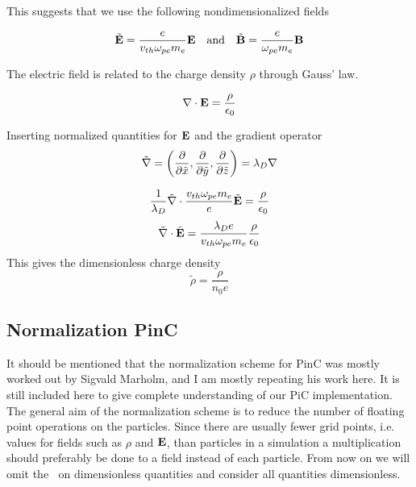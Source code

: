         This suggests that we use the following nondimensionalized fields

        \begin{equation}
            \tilde{\vb{E}} = \frac{e}{v_{th}\omega_{pe}m_e}\vb{E} \quad{\text{and}} \quad \tilde{\vb{B}} = \frac{e}{\omega_{pe}m_e}\vb{B}
        \end{equation}

        The electric field is related to the charge density \(\rho\) through Gauss'
        law.

        \begin{equation}
            \nabla \cdot \vb{E} = \frac{\rho}{\epsilon_0}
        \end{equation}

        Inserting normalized quantities for \(\vb{E}\) and the gradient operator
        \[\tilde{\nabla}=\left(\pdv{\tilde x}, \pdv{\tilde y} , \pdv{\tilde z}\right) = \lambda_D \nabla\]

        \begin{equation}
            \frac{1}{\lambda_D}\tilde\nabla \cdot \frac{v_{th}\omega_{pe}m_e}{e}\tilde{\vb{E}} = \frac{\rho}{\epsilon_0}
        \end{equation}
        \begin{equation}
            \tilde\nabla \cdot\tilde{\vb{E}} = \frac{\lambda_De}{v_{th}\omega_{pe}m_e}\frac{\rho}{\epsilon_0}
        \end{equation}
        This gives the dimensionless charge density
        \begin{equation}
            \tilde \rho = \frac{\rho}{n_0e}
        \end{equation}

    \subsection{Normalization PinC}
        It should be mentioned that the normalization scheme for PinC was mostly worked
        out by Sigvald Marholm, and I am mostly repeating his work here. It is still
        included here to give complete understanding of our PiC implementation.
        The general aim of the normalization scheme is to reduce the number of
        floating point operations on the particles. Since there are usually
        fewer grid points, i.e. values for fields such as \(\rho\) and \(\vb{E}\),
        than particles in a simulation a multiplication should preferably be done to
        a field instead of each particle. From now on we will omit the \(~\) on dimensionless
        quantities and consider all quantities dimensionless.

